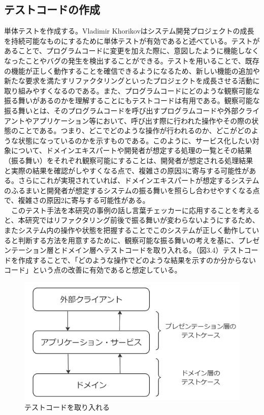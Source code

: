 \documentclass[12pt, a4paper]{jreport}
\begin{document}
\subsection{テストコードの作成}
単体テストを作成する。Vladimir Khorikov\cite{Tantai}はシステム開発プロジェクトの成長を持続可能なものにするために単体テストが有効であると述べている。テストがあることで、プログラムコードに変更を加えた際に、意図したように機能しなくなったことやバグの発生を検出することができる。テストを用いることで、既存の機能が正しく動作することを確信できるようになるため、新しい機能の追加や新たな要求を満たすリファクタリングといったプロジェクトを成長させる活動に取り組みやすくなるのである。また、プログラムコードにどのような観察可能な振る舞いがあるのかを理解することにもテストコードは有用である。観察可能な振る舞いとは、そのプログラムコードを呼び出すプログラムコードや外部クライアントやアプリケーション等において、呼び出す際に行われた操作やその際の状態のことである。つまり、どこでどのような操作が行われるのか、どこがどのような状態になっているのかを示すものである。このように、サービス化したい対象について、ドメインエキスパートや開発者が想定する処理の一覧とその結果（振る舞い）をそれぞれ観察可能にすることは、開発者が想定される処理結果と実際の結果を確認がしやすくなる点で、複雑さの原因3に寄与する可能性がある。さらにこれが実現されていれば、ドメインエキスパートが想定するシステムのふるまいと開発者が想定するシステムの振る舞いを照らし合わせやすくなる点で、複雑さの原因2に寄与する可能性がある。
\\　このテスト手法を本研究の事例の話し言葉チェッカーに応用することを考えると、本研究ではリファクタリング前後で振る舞いが変わらないようにするため、またシステム内の操作や状態を把握することでこのシステムが正しく動作していると判断する方法を用意するために、観察可能な振る舞いの考えを基に、プレゼンテーション層とドメイン層へテストコードを取り入れる。（図3.4）テストコードを作成することで、「どのような操作でどのような結果を示すのか分からないコード」という点の改善に有効であると想定している。
\begin{figure}[H]
\centering
\includegraphics[width=1\linewidth]{image/layerTest.png}
\caption{テストコードを取り入れる}
\label{fig:enter-label}
\end{figure}
\end{document}
